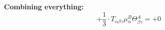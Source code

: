 \documentclass{article}
\begin{document}
\textbf{Combining everything:}
\begin{equation}
+ \frac{1}{3} \cdot T_{\alpha{}\beta{}\gamma{}} \mu{}^{B}_{\alpha{}} \Theta{}^{A}_{\beta{}\gamma{}} = + 0
\end{equation}
\end{document}
